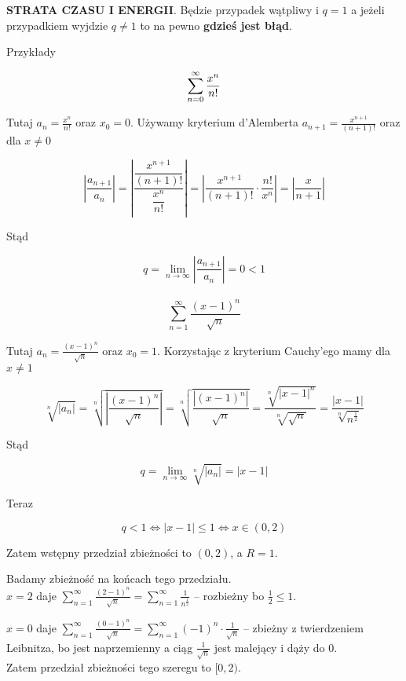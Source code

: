 \textbf{STRATA CZASU I ENERGII}. Będzie przypadek wątpliwy i $q = 1$ a jeżeli przypadkiem wyjdzie
$q \neq 1$ to na pewno \textbf{gdzieś jest błąd}.

Przykłady

$$ \sum\limits_{n = 0}^{\infty} \frac{x^n}{n!} $$

Tutaj $ a_n = \frac{x^n}{n!} $ oraz $ x_0 = 0 $. Używamy kryterium d'Alemberta $ a_{n+1} = \frac{x^{n+1}}{(n+1)!} $ oraz
dla $x \neq 0$

$$ \left| \frac{a_{n+1}}{a_n} \right| = \left| \frac{ \dfrac{x^{ n+1 }}{ (n+1)! } }{ \dfrac{ x^n }{ n! } } \right| 
= \left| \frac{x^{n+1}}{(n+1)!} \cdot \frac{n!}{x^n} \right| = \left| \frac{x}{n+1} \right| $$

Stąd

$$ q = \lim_{n \to \infty} \left| \frac{a_{n+1}}{a_n} \right| = 0 < 1 $$ \\

$$ \sum\limits_{n = 1}^{\infty} \frac{(x - 1)^n}{\sqrt{n}} $$

Tutaj $ a_n = \frac{(x - 1)^n}{\sqrt{n}} $ oraz $ x_0 = 1 $. Korzystając z kryterium Cauchy'ego mamy dla $x \neq 1$

$$ \sqrt[n]{|a_n|} = \sqrt[n]{ \left| \frac{(x-1)^n}{\sqrt{n}} \right| } = \sqrt[n]{ \frac{\left|(x-1)^n \right|}{\sqrt{n}} }
= \frac{ \sqrt[n]{|x-1|^n} }{ \sqrt[n]{\sqrt{n}} } = \frac{|x-1|}{\sqrt[n]{n^{\frac{1}{2}}}}$$

Stąd

$$ q = \lim_{n \to \infty} \sqrt[n]{|a_n|} = |x-1| $$

Teraz

$$ q < 1 \Leftrightarrow |x - 1| \leq 1 \Leftrightarrow x \in (0, 2) $$

Zatem wstępny przedział zbieżności to $(0, 2)$, a $R = 1$.

Badamy zbieżność na końcach tego przedziału. \\

$x = 2$ daje $ \sum\limits_{n = 1}^{\infty} \frac{(2 - 1)^n}{\sqrt{n}} = \sum\limits_{n = 1}^{\infty} \frac{1}{n^{\frac{1}{2}}} $
-- rozbieżny bo $ \frac{1}{2} \leq 1 $.

$x = 0$ daje $ \sum\limits_{n = 1}^{\infty} \frac{(0 - 1)^n}{\sqrt{n}} = \sum\limits_{n = 1}^{\infty} (-1)^n \cdot \frac{1}{\sqrt{n}} $
-- zbieżny z twierdzeniem Leibnitza, bo jest naprzemienny a ciąg $ \frac{1}{\sqrt{n}} $ jest malejący i dąży do $0$. \\

Zatem przedział zbieżności tego szeregu to $[0, 2)$. \\

